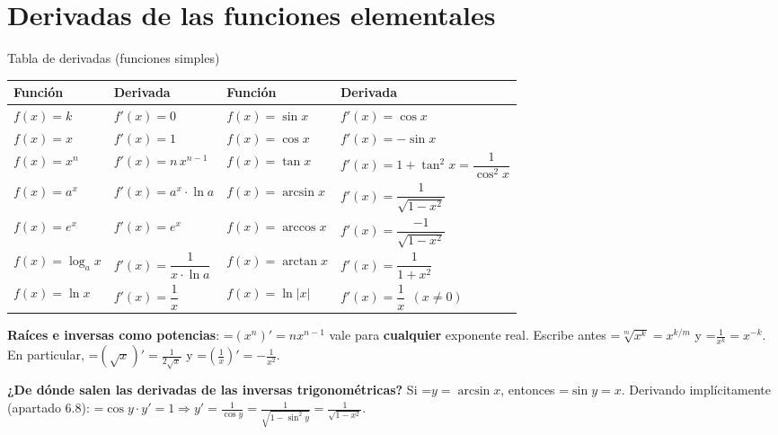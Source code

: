 \documentclass[11pt,a4paper]{article}
\newcommand{\fmm}[1]{\setbox0=\hbox{$#1$}\ifdim\wd0>\linewidth\fmdisp{#1}\else\mbox{\box0}\fi}
\newcommand{\fmdisp}[1]{\[\setbox2=\hbox{$\displaystyle #1$}\ifdim\wd2>\linewidth\resizebox{\linewidth}{!}{\box2}\else\box2\fi\]}
\newcommand{\fmuline}[1]{\textbf{\color{fmaccent}#1}}
\begin{document}
\section{Derivadas de las funciones elementales}\hypertarget{sec5}{}

\begin{fmdef}{Tabla de derivadas (funciones simples)}
\begin{center}\renewcommand{\arraystretch}{1.5}\small\begin{tabularx}{\linewidth}{>{\raggedright\arraybackslash}p{3.2cm}>{\raggedright\arraybackslash}X>{\raggedright\arraybackslash}X>{\raggedright\arraybackslash}X}\toprule
\textbf{Función} & \textbf{Derivada} & \textbf{Función} & \textbf{Derivada}\\\midrule
$f(x)=k$ & $f'(x)=0$ & $f(x)=\sin x$ & $f'(x)=\cos x$\\[3pt]
$f(x)=x$ & $f'(x)=1$ & $f(x)=\cos x$ & $f'(x)=-\sin x$\\[3pt]
$f(x)=x^n$ & $f'(x)=n\,x^{n-1}$ & $f(x)=\tan x$ & $f'(x)=1+\tan^2x=\dfrac{1}{\cos^2x}$\\[3pt]
$f(x)=a^x$ & $f'(x)=a^x\cdot\ln a$ & $f(x)=\arcsin x$ & $f'(x)=\dfrac{1}{\sqrt{1-x^2}}$\\[3pt]
$f(x)=e^x$ & $f'(x)=e^x$ & $f(x)=\arccos x$ & $f'(x)=\dfrac{-1}{\sqrt{1-x^2}}$\\[3pt]
$f(x)=\log_a x$ & $f'(x)=\dfrac{1}{x\cdot\ln a}$ & $f(x)=\arctan x$ & $f'(x)=\dfrac{1}{1+x^2}$\\[3pt]
$f(x)=\ln x$ & $f'(x)=\dfrac1x$ & $f(x)=\ln|x|$ & $f'(x)=\dfrac1x\ \ (x\neq0)$\\[3pt]
\bottomrule\end{tabularx}\end{center}

\begin{fmnote}\fmuline{Raíces e inversas como potencias}: \fmm{(x^n)'=nx^{n-1}} vale para \textbf{cualquier} exponente real. Escribe antes \fmm{\sqrt[m]{x^k}=x^{k/m}} y \fmm{\frac{1}{x^k}=x^{-k}}. En particular, \fmm{\left(\sqrt x\right)'=\frac{1}{2\sqrt x}} y \fmm{\left(\frac1x\right)'=-\frac{1}{x^2}}.\end{fmnote}

\begin{fmnote}\fmuline{¿De dónde salen las derivadas de las inversas trigonométricas?} Si \fmm{y=\arcsin x}, entonces \fmm{\sin y=x}. Derivando implícitamente (apartado 6.8): \fmm{\cos y\cdot y'=1\Rightarrow y'=\frac{1}{\cos y}=\frac{1}{\sqrt{1-\sin^2y}}=\frac{1}{\sqrt{1-x^2}}}.\end{fmnote}
\end{fmdef}
\end{document}
